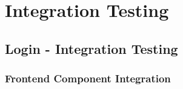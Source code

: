 \documentclass[a4paper,12pt]{article}
\begin{document}

\section{Integration Testing}

\subsection{Login - Integration Testing}

\subsubsection{Frontend Component Integration}
\end{document}
